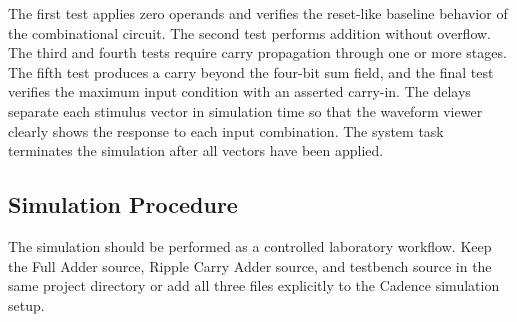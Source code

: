 
\noindent The first test applies zero operands and verifies the reset-like baseline behavior of the
combinational circuit. The second test performs addition without overflow. The third and fourth
tests require carry propagation through one or more stages. The fifth test produces a carry beyond
the four-bit sum field, and the final test verifies the maximum input condition with an asserted
carry-in. The  delays separate each stimulus vector in simulation time so that the
waveform viewer clearly shows the response to each input combination. The 
system task terminates the simulation after all vectors have been applied.

\subsection{Simulation Procedure}
The simulation should be performed as a controlled laboratory workflow. Keep the Full Adder source,
Ripple Carry Adder source, and testbench source in the same project directory or add all three files
explicitly to the Cadence simulation setup.

